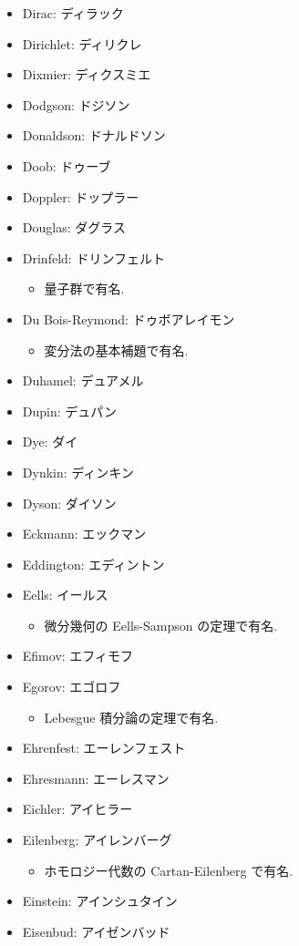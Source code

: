 \documentclass[openany, a4paper, oneside]{jsbook}
\begin{document}
\begin{itemize}
\item Dirac: ディラック
\item Dirichlet: ディリクレ
\item Dixmier: ディクスミエ
\item Dodgson: ドジソン
\item Donaldson: ドナルドソン
\item Doob: ドゥーブ
\item Doppler: ドップラー
\item Douglas: ダグラス
\item Drinfeld: ドリンフェルト
\begin{itemize}
\item 量子群で有名.
\end{itemize}
\item Du Bois-Reymond: ドゥボアレイモン
\begin{itemize}
\item 変分法の基本補題で有名.
\end{itemize}
\item Duhamel: デュアメル
\item Dupin: デュパン
\item Dye: ダイ
\item Dynkin: ディンキン
\item Dyson: ダイソン
\item Eckmann: エックマン
\item Eddington: エディントン
\item Eells: イールス
\begin{itemize}
\item 微分幾何の Eells-Sampson の定理で有名.
\end{itemize}
\item Efimov: エフィモフ
\item Egorov: エゴロフ
\begin{itemize}
\item Lebesgue 積分論の定理で有名.
\end{itemize}
\item Ehrenfest: エーレンフェスト
\item Ehresmann: エーレスマン
\item Eichler: アイヒラー
\item Eilenberg: アイレンバーグ
\begin{itemize}
\item ホモロジー代数の Cartan-Eilenberg で有名.
\end{itemize}
\item Einstein: アインシュタイン
\item Eisenbud: アイゼンバッド

\end{itemize}
\end{document}
